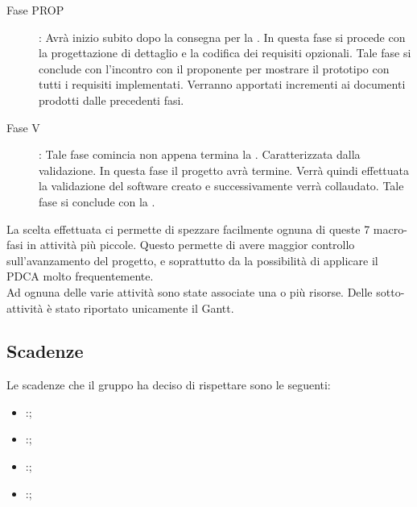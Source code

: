 \begin{description}
			\item[Fase PROP]: Avrà inizio subito dopo la consegna per la . In questa fase si procede con la progettazione di dettaglio e la codifica dei requisiti opzionali. Tale fase si conclude con l'incontro con il proponente per mostrare il prototipo con tutti i requisiti implementati. Verranno apportati incrementi ai documenti prodotti dalle precedenti fasi.
			\item[Fase V]: Tale fase comincia non appena termina la . Caratterizzata dalla validazione. In questa fase il progetto avrà termine. Verrà quindi effettuata la validazione del software creato e successivamente verrà collaudato. Tale fase si conclude con la .
		\end{description}
		La scelta effettuata ci permette di spezzare facilmente ognuna di queste 7 macro-fasi in attività più piccole. Questo permette di avere maggior controllo sull'avanzamento del progetto, e soprattutto da la possibilità di applicare il PDCA molto frequentemente.\\Ad ognuna delle varie attività sono state associate una o più risorse. Delle sotto-attività è stato riportato unicamente il Gantt.
	\subsection{Scadenze}
		Le scadenze che il gruppo \groupname{} ha deciso di rispettare sono le seguenti:
		\begin{itemize}
			\item {}:;
			\item {}:;
			\item {}:;
			\item {}:;
		\end{itemize}
